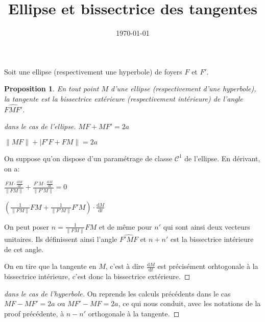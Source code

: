 \documentclass[12pt,a4paper,french]{article}
\title{Ellipse et bissectrice des tangentes}
\date{\today}
\theoremstyle{definition}
\theoremstyle{plain}
\newtheorem{proposition}[definition]{Proposition}
\theoremstyle{remark}
\begin{document}
\maketitle


Soit une ellipse (respectivement une hyperbole) de foyers $F$ et $F'$.

\begin{proposition}
  En tout point $M$ d'une ellipse (respectivement d'une hyperbole), la
  tangente est la bissectrice extérieure (respectivement intérieure) de
  l'angle $\widehat{FMF'}$.
\end{proposition}

\begin{proof}[dans le cas de l'ellipse]
  $MF+MF'=2a$

  $\lVert MF\rVert + \lvert F'F +FM\rVert = 2a$

  On suppose qu'on dispose d'un paramétrage de classe $\mathcal{C}^1$ de
  l'ellipse. En dérivant, on a:

  $\frac{FM\cdot\frac{\mathrm{d}M}{\mathrm{d}t}}{\lVert FM\rVert} +
  \frac{F'M\cdot\frac{\mathrm{d}M}{\mathrm{d}t}}{\lVert F'M\rVert} = 0$

  $\left(\frac1{\lVert FM\rVert}FM + \frac1{\lVert F'M\rVert}F'M\right)
  \cdot \frac{\mathrm{d}M}{\mathrm{d}t}$

  On peut poser $n=\frac1{\lVert FM\rVert}FM$ et de même pour $n'$ qui
  sont ainsi deux vecteurs unitaires. Ils définissent ainsi l'angle
  $\widehat{F'MF}$ et $n+n'$ est la bissectrice intérieure de cet angle.

  On en tire que la tangente en $M$, c'est à dire
  $\frac{\mathrm{d}M}{\mathrm{d}t}$ est précisément orhtogonale à la
  bissectrice intérieure, c'est donc la bissectrice extérieure.
\end{proof}

\begin{proof}[dans le cas de l'hyperbole]
  On reprends les calculs précédents dans le cas $MF-MF'=2a$ ou
  $MF'-MF=2a$, ce qui nous conduit, avec les notations de la proof
  précédente, à $n-n'$ orthogonale à la tangente.
\end{proof}
\end{document}
